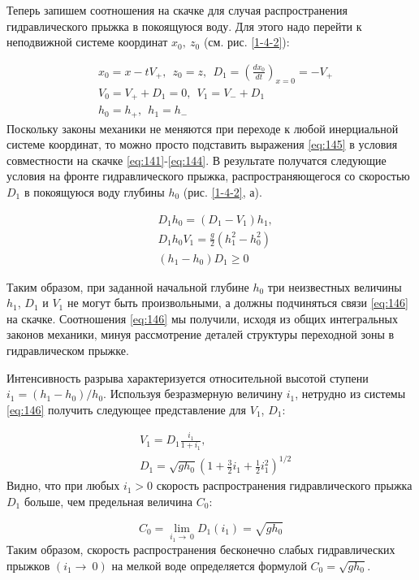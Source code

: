 \documentclass[specialist, subf, href, colorlinks=true, 14pt, final]{disser}
\theoremstyle{definition}
\begin{document}
Теперь запишем соотношения на скачке для случая распространения гидравлического прыжка в покоящуюся воду. Для этого надо перейти к неподвижной системе координат $x_{0},\ z_{0}$ (см. рис. \ref{1-4-2}):
\addtocounter{equation}{1}
\begin{equation}\label{eq:145}
  \begin{aligned}
  &x_{0} = x - tV_{+},\ \ z_{0} = z,\ \ D_{1} = \left(\frac{dx_0}{dt}\right)_{x=0} = -V_{+}\\
  &V_{0} = V_{+} + D_{1} = 0,\ \ V_{1} = V_{-} + D_{1}\\
  &h_{0} = h_{+},\ \ h_{1} = h_{-}
  \end{aligned}
  \tag{5}
\end{equation}
Поскольку законы механики не меняются при переходе к любой инерциальной системе координат, то можно просто подставить выражения \eqref{eq:145} в условия совместности на скачке \eqref{eq:141}-\eqref{eq:144}. В результате получатся следующие условия на фронте гидравлического прыжка, распространяющегося со скоростью $D_1$ в покоящуюся воду глубины $h_0$ (рис. \ref{1-4-2}, а).
\addtocounter{equation}{1}
\begin{equation}\label{eq:146}
  \begin{aligned}
  & D_{1}h_{0} = (D_{1} - V_{1})h_{1}, \\
  & D_{1}h_{0}V_{1} = \frac{g}{2}(h_{1}^{2} - h_{0}^{2}) \\
  & (h_{1} - h_{0})D_{1} \geqslant 0
  \end{aligned}
  \tag{6}
\end{equation}

Таким образом, при заданной начальной глубине $h_0$ три неизвестных величины $h_1$, $D_1$ и $V_1$ не могут быть произвольными, а должны подчиняться связи \eqref{eq:146} на скачке. Соотношения \eqref{eq:146} мы получили, исходя из общих интегральных законов механики, минуя рассмотрение деталей структуры переходной зоны в гидравлическом прыжке.

Интенсивность разрыва характеризуется относительной высотой
ступени $i_{1} = (h_{1} - h_{0})/h_{0}$. Используя безразмерную величину $i_{1}$, нетрудно из системы \eqref{eq:146} получить следующее представление для $V_1$, $D_1$:
\addtocounter{equation}{1}
\begin{equation}\label{eq:147}
  \begin{aligned}
  & V_{1} = D_{1}\frac{i_{1}}{1+i_{1}}, \\
  & D_{1} = \sqrt{gh_{0}}\left(1 + \frac{3}{2}i_{1} + \frac{1}{2}i_{1}^{2}\right)^{1/2}
  \end{aligned}
  \tag{7}
\end{equation}
Видно, что при любых $i_{1} > 0$ скорость распространения гидравлического прыжка $D_1$ больше, чем предельная величина $C_0$:
\addtocounter{equation}{1}
\begin{equation}\label{eq:148}
  C_{0} = \lim\limits_{i_1 \rightarrow\ 0} D_{1}(i_{1}) = \sqrt{gh_{0}}
  \tag{8}
\end{equation}
Таким образом, скорость распространения бесконечно слабых гидравлических прыжков $(i_1 \rightarrow\ 0)$ на мелкой воде определяется формулой $C_{0} = \sqrt{gh_{0}}$.\\
\end{document}
